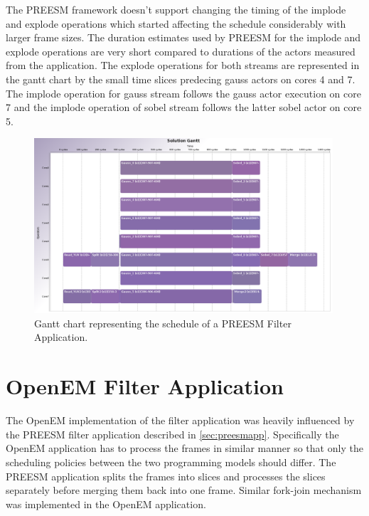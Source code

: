 The PREESM framework doesn't support changing the timing of the implode and
explode operations which started affecting the schedule considerably with larger
frame sizes. The duration estimates used by PREESM for the implode and explode
operations are very short compared to durations of the actors measured from the
application. The explode operations for both streams are represented in the
gantt chart by the small time slices predecing gauss actors on cores 4 and 7.
The implode operation for gauss stream follows the gauss actor execution on core
7 and the implode operation of sobel stream follows the latter sobel actor on
core 5.

\begin{figure}[h!] \label{fig:preesm_gantt} \begin{center}
    \includegraphics[width=0.99\textwidth]{images/gantt_preesm_cifcif.png}
    \caption{Gantt chart representing the schedule of a PREESM Filter
    Application.} \end{center}
\end{figure}

\section{OpenEM Filter Application}
The OpenEM implementation of the filter application was heavily influenced by
the PREESM filter application described in \ref{sec:preesmapp}. Specifically the
OpenEM application has to process the frames in similar manner so that only the
scheduling policies between the two programming models should differ. The PREESM
application splits the frames into slices and processes the slices separately
before merging them back into one frame. Similar fork-join mechanism was
implemented in the OpenEM application.


